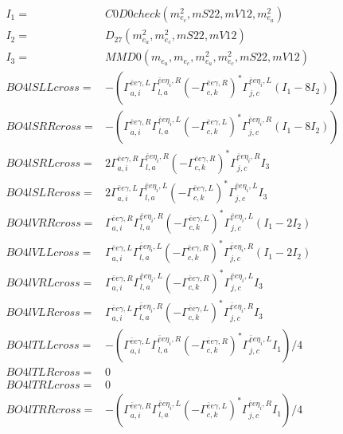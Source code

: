 \documentclass[A4,landscape]{article}
\begin{document}
\begin{align} 
I_1 = & C0D0check(m^2_{e_{{c}}}, mS22, mV12, m^2_{e_{{a}}}) \\ 
I_2 = & D_{27}(m^2_{e_{{a}}}, m^2_{e_{{c}}}, mS22, mV12) \\ 
I_3 = & MMD0(m_{e_{{a}}}, m_{e_{{c}}}, m^2_{e_{{a}}}, m^2_{e_{{c}}}, mS22, mV12) \\ 
  BO4lSLLcross= & -( \Gamma^{\bar{e}e \gamma ,L}_{a, i} \Gamma^{\bar{e}e \eta_i ,R}_{l, a} (- \Gamma^{\bar{e}e \gamma ,R} _{c, k})^* \Gamma^{\bar{e}e \eta_i ,L}_{j, c} (I_1 - 8 I_2)) \\ 
  BO4lSRRcross= & -( \Gamma^{\bar{e}e \gamma ,R}_{a, i} \Gamma^{\bar{e}e \eta_i ,L}_{l, a} (- \Gamma^{\bar{e}e \gamma ,L} _{c, k})^* \Gamma^{\bar{e}e \eta_i ,R}_{j, c} (I_1 - 8 I_2)) \\ 
  BO4lSRLcross= & 2  \Gamma^{\bar{e}e \gamma ,R}_{a, i} \Gamma^{\bar{e}e \eta_i ,R}_{l, a} (- \Gamma^{\bar{e}e \gamma ,R} _{c, k})^* \Gamma^{\bar{e}e \eta_i ,R}_{j, c} I_3 \\ 
  BO4lSLRcross= & 2  \Gamma^{\bar{e}e \gamma ,L}_{a, i} \Gamma^{\bar{e}e \eta_i ,L}_{l, a} (- \Gamma^{\bar{e}e \gamma ,L} _{c, k})^* \Gamma^{\bar{e}e \eta_i ,L}_{j, c} I_3 \\ 
  BO4lVRRcross= &  \Gamma^{\bar{e}e \gamma ,R}_{a, i} \Gamma^{\bar{e}e \eta_i ,R}_{l, a} (- \Gamma^{\bar{e}e \gamma ,L} _{c, k})^* \Gamma^{\bar{e}e \eta_i ,L}_{j, c} (I_1 - 2 I_2) \\ 
  BO4lVLLcross= &  \Gamma^{\bar{e}e \gamma ,L}_{a, i} \Gamma^{\bar{e}e \eta_i ,L}_{l, a} (- \Gamma^{\bar{e}e \gamma ,R} _{c, k})^* \Gamma^{\bar{e}e \eta_i ,R}_{j, c} (I_1 - 2 I_2) \\ 
  BO4lVRLcross= &  \Gamma^{\bar{e}e \gamma ,R}_{a, i} \Gamma^{\bar{e}e \eta_i ,L}_{l, a} (- \Gamma^{\bar{e}e \gamma ,R} _{c, k})^* \Gamma^{\bar{e}e \eta_i ,L}_{j, c} I_3 \\ 
  BO4lVLRcross= &  \Gamma^{\bar{e}e \gamma ,L}_{a, i} \Gamma^{\bar{e}e \eta_i ,R}_{l, a} (- \Gamma^{\bar{e}e \gamma ,L} _{c, k})^* \Gamma^{\bar{e}e \eta_i ,R}_{j, c} I_3 \\ 
  BO4lTLLcross= & -( \Gamma^{\bar{e}e \gamma ,L}_{a, i} \Gamma^{\bar{e}e \eta_i ,R}_{l, a} (- \Gamma^{\bar{e}e \gamma ,R} _{c, k})^* \Gamma^{\bar{e}e \eta_i ,L}_{j, c} I_1)/4 \\ 
  BO4lTLRcross= & 0 \\ 
  BO4lTRLcross= & 0 \\ 
  BO4lTRRcross= & -( \Gamma^{\bar{e}e \gamma ,R}_{a, i} \Gamma^{\bar{e}e \eta_i ,L}_{l, a} (- \Gamma^{\bar{e}e \gamma ,L} _{c, k})^* \Gamma^{\bar{e}e \eta_i ,R}_{j, c} I_1)/4 \\ 
\end{align} 
\end{document}
